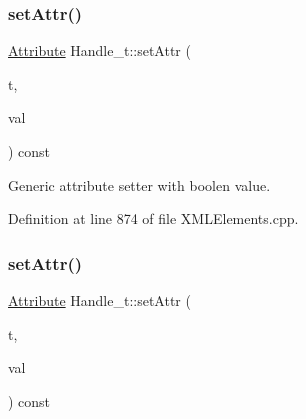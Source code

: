 \hypertarget{class_d_d4hep_1_1_x_m_l_1_1_handle__t_ab38aeee31ce22932a68b908ee6999c24}{}\label{class_d_d4hep_1_1_x_m_l_1_1_handle__t_ab38aeee31ce22932a68b908ee6999c24} 
\subsubsection{\texorpdfstring{set\+Attr()}{setAttr()}\hspace{0.1cm}{\footnotesize\ttfamily [4/8]}}
{\footnotesize\ttfamily \hyperlink{namespace_d_d4hep_1_1_x_m_l_a5c19b7116be99d69b4b22d911357baaf}{Attribute} Handle\+\_\+t\+::set\+Attr (\begin{DoxyParamCaption}\item[{const \hyperlink{namespace_d_d4hep_1_1_x_m_l_a09e5d9cc86ed782f6826dfe0778c1815}{Xml\+Char} $\ast$}]{t,  }\item[{bool}]{val }\end{DoxyParamCaption}) const}



Generic attribute setter with boolen value. 



Definition at line 874 of file X\+M\+L\+Elements.\+cpp.

\hypertarget{class_d_d4hep_1_1_x_m_l_1_1_handle__t_a10e2e208eaa4ab12b486a62deb27cddf}{}\label{class_d_d4hep_1_1_x_m_l_1_1_handle__t_a10e2e208eaa4ab12b486a62deb27cddf} 
\subsubsection{\texorpdfstring{set\+Attr()}{setAttr()}\hspace{0.1cm}{\footnotesize\ttfamily [5/8]}}
{\footnotesize\ttfamily \hyperlink{namespace_d_d4hep_1_1_x_m_l_a5c19b7116be99d69b4b22d911357baaf}{Attribute} Handle\+\_\+t\+::set\+Attr (\begin{DoxyParamCaption}\item[{const \hyperlink{namespace_d_d4hep_1_1_x_m_l_a09e5d9cc86ed782f6826dfe0778c1815}{Xml\+Char} $\ast$}]{t,  }\item[{float}]{val }\end{DoxyParamCaption}) const}



